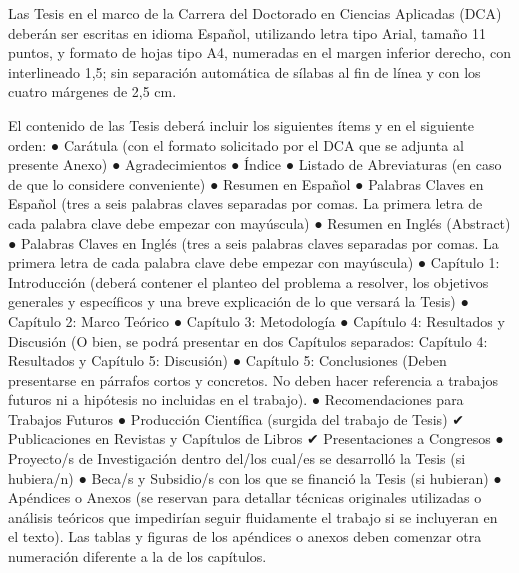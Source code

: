 Las Tesis  en el marco de la Carrera del Doctorado en Ciencias Aplicadas (DCA) deberán ser escritas en idioma Español, utilizando letra tipo Arial, tamaño 11 puntos, y formato de hojas tipo A4, numeradas en el margen inferior derecho, con interlineado 1,5; sin separación automática de sílabas al fin de línea y con los cuatro márgenes de 2,5 cm.

El contenido de las Tesis deberá incluir los siguientes ítems y en el siguiente orden:\newline
●	Carátula (con el formato solicitado por el DCA que se adjunta al presente Anexo)\newline
●	Agradecimientos\newline
●	Índice\newline
●	Listado de Abreviaturas (en caso de que lo considere conveniente)\newline
●	Resumen en Español\newline
●	Palabras Claves en Español (tres a seis palabras claves separadas por comas. La primera letra de cada palabra clave debe empezar con mayúscula)\newline
●	Resumen en Inglés (Abstract)\newline
●	Palabras Claves en Inglés (tres a seis palabras claves separadas por comas. La primera letra de cada palabra clave debe empezar con mayúscula)\newline
●	Capítulo 1: Introducción (deberá contener el planteo del problema a resolver, los objetivos generales y específicos y una breve explicación de lo que versará la Tesis)\newline
●	Capítulo 2: Marco Teórico\newline
●	Capítulo 3: Metodología\newline
●	Capítulo 4: Resultados y Discusión (O bien, se podrá presentar en dos Capítulos separados: Capítulo 4: Resultados y Capítulo 5: Discusión)\newline
●	Capítulo 5: Conclusiones (Deben presentarse en párrafos cortos y concretos. No deben hacer referencia a trabajos futuros ni a hipótesis no incluidas en el trabajo).\newline
●	Recomendaciones para Trabajos Futuros\newline
●	Producción Científica (surgida del trabajo de Tesis)\newline
✔	Publicaciones en Revistas y Capítulos de Libros\newline
✔	Presentaciones a Congresos\newline
●	Proyecto/s de Investigación dentro del/los cual/es se desarrolló la Tesis (si hubiera/n)\newline
●	Beca/s y Subsidio/s con los que se financió la Tesis (si hubieran)\newline
●	Apéndices o Anexos (se reservan para detallar técnicas originales utilizadas o análisis teóricos que impedirían seguir fluidamente el trabajo si se incluyeran en el texto). Las tablas y figuras de los apéndices o anexos deben comenzar otra numeración diferente a la de los capítulos.\newline


